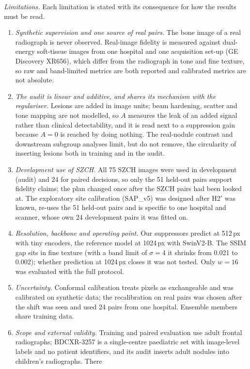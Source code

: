\emph{Limitations.} Each limitation is stated with its consequence for how the results must be read.
\begin{enumerate}
\item \emph{Synthetic supervision and one source of real pairs.} The bone image of a real radiograph is never observed. Real-image fidelity
 is measured against dual-energy soft-tissue images from one hospital and one acquisition set-up (GE Discovery XR656), which differ from
 the radiograph in tone and fine texture, so raw and band-limited metrics are both reported and calibrated metrics are not absolute.
\item \emph{The audit is linear and additive, and shares its mechanism with the regulariser.} Lesions are added in image units; beam
 hardening, scatter and tone mapping are not modelled, so $A$ measures the leak of an added signal rather than clinical detectability, and
 it is read next to a suppression gain because $A=0$ is reached by doing nothing. The real-nodule contrast and downstream subgroup analyses
 limit, but do not remove, the circularity of inserting lesions both in training and in the audit.
\item \emph{Development use of SZCH.} All 75 SZCH images were used in development (audit) and 24 for paired decisions, so only the 51
 held-out pairs support fidelity claims; the plan changed once after the SZCH pairs had been looked at. The exploratory site calibration
 (SAP\_v5) was designed after H2$'$ was known, re-uses the 51 held-out pairs and is specific to one hospital and scanner, whose own 24
 development pairs it was fitted on.
\item \emph{Resolution, backbone and operating point.} Our suppressors predict at 512\,px with tiny encoders, the reference model at
 1024\,px with SwinV2-B. The SSIM gap sits in fine texture (with a band limit of $\sigma=4$ it shrinks from 0.021 to 0.002); whether
 prediction at 1024\,px closes it was not tested. Only $w=16$ was evaluated with the full protocol.
\item \emph{Uncertainty.} Conformal calibration treats pixels as exchangeable and was calibrated on synthetic data; the recalibration on
 real pairs was chosen after the shift was seen and used 24 pairs from one hospital. Ensemble members share training data.
\item \emph{Scope and external validity.} Training and paired evaluation use adult frontal radiographs; BDCXR-3257 is a single-centre
 paediatric set with image-level labels and no patient identifiers, and its audit inserts adult nodules into children's radiographs. There

\end{enumerate}

